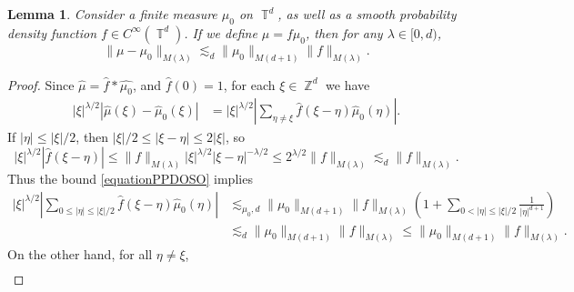 \documentclass[dvipsnames,letterpaper,12pt]{article}
\numberwithin{equation}{section}
\DeclareMathOperator{\ZZ}{\mathbb{Z}}
\DeclareMathOperator{\TT}{\mathbb{T}}
\newtheorem{lemma}[theorem]{Lemma}
\numberwithin{theorem}{section}
\begin{document}
\begin{lemma} \label{LemmaTTSICICS}
    Consider a finite measure $\mu_0$ on $\TT^d$, as well as a smooth probability density function $f \in C^\infty(\TT^d)$. If we define $\mu = f \mu_0$, then for any $\lambda \in [0,d)$,
    \[ \| \mu - \mu_0 \|_{M(\lambda)} \lesssim_d \| \mu_0 \|_{M(d+1)} \| f \|_{M(\lambda)}. \]
\end{lemma}
\begin{proof}
    Since $\widehat{\mu} = \widehat{f} * \widehat{\mu_0}$, and $\widehat{f}(0) = 1$, for each $\xi \in \ZZ^d$ we have
    \begin{equation} \label{equationPPYTUECUUCS}
    \begin{split}
        |\xi|^{\lambda/2} |\widehat{\mu}(\xi) - \widehat{\mu}_0(\xi)| &= |\xi|^{\lambda/2} \left| \sum_{\eta \neq \xi} \widehat{f}(\xi - \eta) \widehat{\mu}_0(\eta) \right|.
    \end{split}
    \end{equation}
    If $|\eta| \leq |\xi|/2$, then $|\xi|/2 \leq |\xi - \eta| \leq 2 |\xi|$, so
    \begin{equation} \label{equationPPDOSO}
        |\xi|^{\lambda/2} |\widehat{f}(\xi - \eta)| \leq \| f \|_{M(\lambda)} |\xi|^{\lambda/2} |\xi-\eta|^{-\lambda/2} \leq 2^{\lambda/2} \| f \|_{M(\lambda)} \lesssim_d \| f \|_{M(\lambda)}.
    \end{equation}
    Thus the bound \eqref{equationPPDOSO} implies
    \begin{equation} \label{equationGGPSOVVCSI}
    \begin{split}
        |\xi|^{\lambda/2} \left| \sum_{0 \leq |\eta| \leq |\xi|/2} \widehat{f}(\xi - \eta) \widehat{\mu}_0(\eta) \right| &\lesssim_{\mu_0,d} \| \mu_0 \|_{M(d+1)} \| f \|_{M(\lambda)} \left( 1 + \sum_{0 < |\eta| \leq |\xi|/2} \frac{1}{|\eta|^{d+1}} \right)\\
        &\lesssim_d \| \mu_0 \|_{M(d+1)} \| f \|_{M(\lambda)} \leq \| \mu_0 \|_{M(d+1)} \| f \|_{M(\lambda)}.
    \end{split}
    \end{equation}
    On the other hand, for all $\eta \neq \xi$,
    \begin{equation} \label{equationGGDPSOX}
    \begin{split}

\end{split}
\end{equation}
\end{proof}
\end{document}
